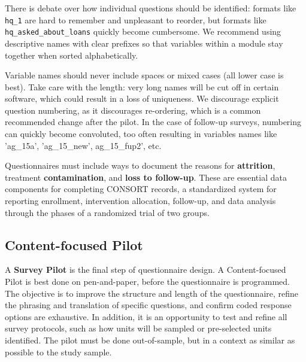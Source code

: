 There is debate over how individual questions should be identified: formats like \texttt{hq\_1} are hard to remember and unpleasant to reorder, but formats like \texttt{hq\_asked\_about\_loans} quickly become cumbersome.
We recommend using descriptive names with clear prefixes so that variables within a module stay together when sorted alphabetically. { Variable names should never include spaces or mixed cases (all lower case is best). Take care with the length: very long names will be cut off in certain software, which could result in a loss of uniqueness. We discourage explicit question numbering, as it discourages re-ordering, which is a common recommended change after the pilot. In the case of follow-up surveys, numbering can quickly become convoluted, too often resulting in variables names like 'ag_15a', 'ag_15_new', ag_15_fup2', etc. 

Questionnaires must include ways to document the reasons for \textbf{attrition}, treatment \textbf{contamination}, and \textbf{loss to follow-up}. 
These are essential data components for completing CONSORT records, a standardized system for reporting enrollment, intervention allocation, follow-up, and data analysis through the phases of a randomized trial of two groups.



\subsection{Content-focused Pilot}
A \textbf{Survey Pilot}  is the final step of questionnaire design. 
A Content-focused Pilot   is best done on pen-and-paper, before the questionnaire is programmed. 
The objective is to improve the structure and length of the questionnaire, refine the phrasing and translation of specific questions, and confirm coded response options are exhaustive. 
In addition, it is an opportunity to test and refine all survey protocols, such as how units will be sampled or pre-selected units identified. The pilot must be done out-of-sample, but in a context as similar as possible to the study sample.

}
